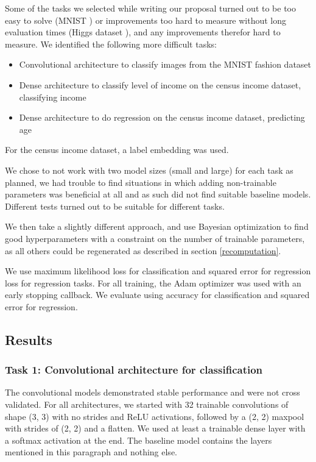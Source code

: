 \documentclass[]{article}
\begin{document}
\begin{multicols}{2}
	Some of the tasks we selected while writing our proposal turned out to be too easy to solve (MNIST \cite{lecun-mnist}) or improvements too hard to measure without long evaluation times (Higgs dataset \cite{Dua:2019}), and any improvements therefor hard to measure. We identified the following more difficult tasks:
	\begin{itemize}
		\itemsep0em
		\item Convolutional architecture to classify images from the MNIST fashion dataset \cite{xiao2017/online}
		\item Dense architecture to classify level of income on the census income dataset, classifying income \cite{Asuncion+Newman:2007}
		\item Dense architecture to do regression on the census income dataset, predicting age \cite{Asuncion+Newman:2007}
	\end{itemize}
	For the census income dataset, a label embedding was used.
	
	We chose to not work with two model sizes (small and large) for each task as planned, we had trouble to find situations in which adding non-trainable parameters was beneficial at all and as such did not find suitable baseline models. Different tests turned out to be suitable for different tasks.
	
	We then take a slightly different approach, and use Bayesian optimization to find good hyperparameters with a constraint on the number of trainable parameters, as all others could be regenerated as described in section \ref{recomputation}.
	
	We use maximum likelihood loss for classification and squared error for regression loss for regression tasks. For all training, the Adam optimizer was used with an early stopping callback. We evaluate using accuracy for classification and squared error for regression.
	
	\subsection{Results}\label{results}
	\subsubsection*{Task 1: Convolutional architecture for classification}
	The convolutional models demonstrated stable performance and were not cross validated. For all architectures, we started with 32 trainable convolutions of shape (3, 3) with no strides and ReLU activations, followed by a (2, 2) maxpool with strides of (2, 2) and a flatten. We used at least a trainable dense layer with a softmax activation at the end. The baseline model contains the layers mentioned in this paragraph and nothing else.
	

\end{multicols}
\end{document}
